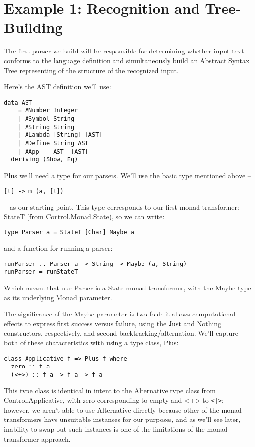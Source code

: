 \documentclass{tmr}
\begin{document}
\section{Example 1: Recognition and Tree-Building}

The first parser we build will be responsible for determining whether input
text conforms to the language definition and simultaneously build an 
Abstract Syntax Tree representing of the structure of the recognized input.

Here's the AST definition we'll use:
\begin{verbatim}
data AST
    = ANumber Integer
    | ASymbol String
    | AString String
    | ALambda [String] [AST]
    | ADefine String AST
    | AApp    AST  [AST]
  deriving (Show, Eq)
\end{verbatim}
Plus we'll need a type for our parsers.  We'll use the basic type mentioned 
above -- \begin{verbatim}[t] -> m (a, [t]) \end{verbatim}
 -- as our starting point.  This type corresponds to our first monad transformer:  
 StateT (from Control.Monad.State), so we can write:
\begin{verbatim}
type Parser a = StateT [Char] Maybe a
\end{verbatim}
and a function for running a parser:
\begin{verbatim}
runParser :: Parser a -> String -> Maybe (a, String)
runParser = runStateT
\end{verbatim}
Which means that our Parser is a State monad transformer, with the Maybe type
as its underlying Monad parameter.

The significance of the Maybe parameter is two-fold:  it allows computational
effects to express first success versus failure, using the Just and Nothing 
constructors, respectively, and second backtracking/alternation.  We'll
capture both of these characteristics with using a type class, Plus:
\begin{verbatim}
class Applicative f => Plus f where
  zero :: f a
  (<+>) :: f a -> f a -> f a
\end{verbatim}
This type class is identical in intent to the Alternative type class from
Control.Applicative, with zero corresponding to empty and <+> to \verb+<|>+; 
however, we aren't able to use Alternative directly because
other of the monad transformers have unsuitable instances for our purposes,
and as we'll see later, inability to swap out such instances is one of the 
limitations of the monad transformer approach.  
\end{document}
